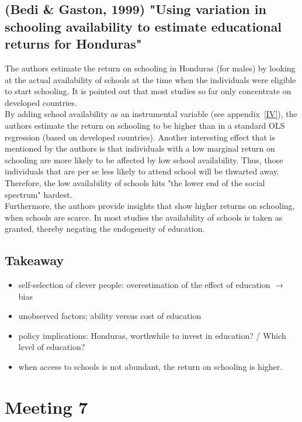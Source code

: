 \documentclass[12pt,a4paper]{article}
\begin{document}
  \subsection{(Bedi \& Gaston, 1999) "Using variation in schooling availability to estimate educational returns for Honduras"} %
  \label{sub:bedi}
  The authors estimate the return on schooling in Honduras (for males) by looking at the actual availability of schools at the
  time when the individuals were eligible to start schooling. It is pointed out that most studies so far only concentrate
  on developed countries.\\
  By adding school availability as an instrumental variable (see appendix~\ref{IV}), the authors estimate the return
  on schooling to be higher than in a standard OLS regression (based on developed countries). Another interesting effect
  that is mentioned by the authors is that individuals with a low marginal return on schooling are more likely to
  be affected by low school availability. Thus, those individuals that are per se less likely to attend school will
  be thwarted away. Therefore, the low availability of schools hits "the lower end of the social spectrum" hardest.\\
  Furthermore, the authors provide insights that show higher returns on schooling, when schools are scarce. In most
  studies the availability of schools is taken as granted, thereby negating the endogeneity of education.\\

  \subsection{Takeaway} %
    \begin{itemize}
      \item self-selection of clever people: overestimation of the effect of education $\rightarrow$
        bias
      \item unobserved factors; ability versus cost of education
      \item policy implications: Honduras, worthwhile to invest in education? / Which level of
        education?
      \item when access to schools is not abundant, the return on schooling is higher.
    \end{itemize}

  \section{Meeting 7} %
  \label{sec:Meeting 7}
\end{document}
